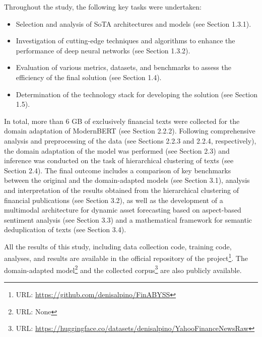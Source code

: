 Throughout the study, the following key tasks were undertaken:
\begin{itemize}
    \item Selection and analysis of SoTA architectures and models (see Section 1.3.1).
    \item Investigation of cutting-edge techniques and algorithms to enhance the performance of deep neural networks (see Section 1.3.2).
    \item Evaluation of various metrics, datasets, and benchmarks to assess the efficiency of the final solution (see Section 1.4).
    \item Determination of the technology stack for developing the solution (see Section 1.5).
\end{itemize}

In total, more than 6 GB of exclusively financial texts were collected for the domain adaptation of ModernBERT (see Section 2.2.2).
Following comprehensive analysis and preprocessing of the data (see Sections 2.2.3 and 2.2.4, respectively), the domain adaptation
of the model was performed (see Section 2.3) and inference was conducted on the task of hierarchical clustering of texts
(see Section 2.4). The final outcome includes a comparison of key benchmarks between the original and the domain-adapted models
(see Section 3.1), analysis and interpretation of the results obtained from the hierarchical clustering of financial
 publications (see Section 3.2), as well as the development of a multimodal architecture for dynamic asset forecasting based
 on aspect-based sentiment analysis (see Section 3.3) and a mathematical framework for semantic deduplication of texts
 (see Section 3.4).

 All the results of this study, including data collection code, training code, analyses, and results are available
 in the official repository of the project\footnote{URL: \url{https://github.com/denisalpino/FinABYSS}}.
 The domain-adapted model\footnote{URL: None} and the collected
 corpus\footnote{URL: \url{https://huggingface.co/datasets/denisalpino/YahooFinanceNewsRaw}} are also publicly available.
